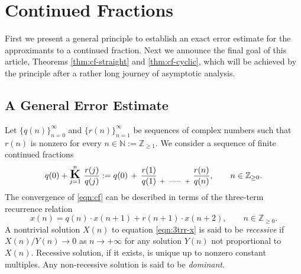 \documentclass[a4paper,12pt]{article}
\theoremstyle{plain}
\def\N{\mathbb{N}}
\def\Z{\mathbb{Z}}
\def\cfL{\mbox{\Large \boldmath $\mathrm{K}$}}
\begin{document}
\section{Continued Fractions} \label{sec:cf}
First we present a general principle to establish an exact error estimate for 
the approximants to a continued fraction.   
Next we announce the final goal of this article, Theorems 
\ref{thm:cf-straight} and \ref{thm:cf-cyclic}, which will be achieved by 
the principle after a rather long journey of asymptotic analysis. 
\subsection{A General Error Estimate} \label{subsec:gee}
Let $\{ q(n) \}_{n=0}^{\infty}$ and  $\{ r(n) \}_{n=1}^{\infty}$ be 
sequences of complex numbers such that $r(n)$ is nonzero  
for every $n \in \N := \Z_{\ge 1}$.  
We consider a sequence of finite continued fractions 
\begin{equation} \label{eqn:cf}
q(0) + \overset{n}{\underset{j=1}{\cfL}} \,\, \frac{r(j)}{q(j)} 
:= q(0) \, + \, \frac{r(1)}{q(1)} \, \mathop{}_{+} \,\,  
\mathop{}_{\cdots\cdots} \,\, \mathop{}_{+} \, \frac{r(n)}{q(n)}, \qquad 
n \in \Z_{\ge 0}.  
\end{equation}
The convergence of \eqref{eqn:cf} can be described in terms of 
the three-term recurrence relation 
\begin{equation} \label{eqn:3trr-x}
x(n) = q(n) \cdot x(n+1) + r(n+1) \cdot x(n+2), \qquad n \in \Z_{\ge 0}.  
\end{equation}
A nontrivial solution $X(n)$ to equation \eqref{eqn:3trr-x} is said to be 
{\sl recessive} if $X(n)/Y(n) \to 0$ as $n \to +\infty$ for any 
solution $Y(n)$ not proportional to $X(n)$. 
Recessive solution, if it exists, is unique up to nonzero constant multiples.  
Any non-recessive solution is said to be {\sl dominant}.   
\end{document}
